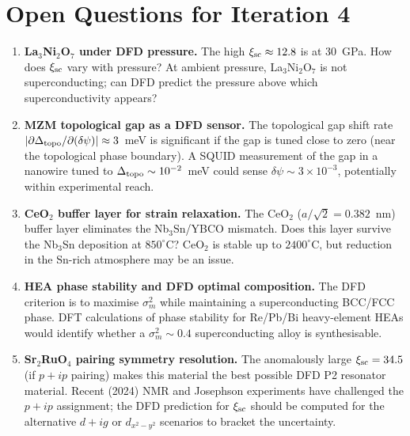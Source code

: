 \documentclass[11pt]{article}
\newcommand{\ee}[1]{\times 10^{#1}}
\begin{document}
\section*{Open Questions for Iteration 4}

\begin{enumerate}[leftmargin=*]

\item \textbf{La$_3$Ni$_2$O$_7$ under DFD pressure.} The high $\xi_{\rm sc} \approx 12.8$
  is at 30~GPa. How does $\xi_{\rm sc}$ vary with pressure? At ambient
  pressure, La$_3$Ni$_2$O$_7$ is not superconducting; can DFD predict
  the pressure above which superconductivity appears?

\item \textbf{MZM topological gap as a DFD sensor.} The topological gap shift
  rate $|\partial\Delta_{\rm topo}/\partial(\delta\psi)| \approx 3$~meV is
  significant if the gap is tuned close to zero (near the topological phase
  boundary). A SQUID measurement of the gap in a nanowire tuned to
  $\Delta_{\rm topo} \sim 10^{-2}$~meV could sense $\delta\psi \sim 3\ee{-3}$,
  potentially within experimental reach.

\item \textbf{CeO$_2$ buffer layer for strain relaxation.} The CeO$_2$
  ($a/\sqrt{2} = 0.382$~nm) buffer layer eliminates the Nb$_3$Sn/YBCO
  mismatch. Does this layer survive the Nb$_3$Sn deposition at $850^\circ$C?
  CeO$_2$ is stable up to $2400^\circ$C, but reduction in the Sn-rich atmosphere
  may be an issue.

\item \textbf{HEA phase stability and DFD optimal composition.}
  The DFD criterion is to maximise $\sigma_m^2$ while maintaining a
  superconducting BCC/FCC phase. DFT calculations of phase stability
  for Re/Pb/Bi heavy-element HEAs would identify whether a $\sigma_m^2 \sim 0.4$
  superconducting alloy is synthesisable.

\item \textbf{Sr$_2$RuO$_4$ pairing symmetry resolution.} The anomalously
  large $\xi_{\rm sc} = 34.5$ (if $p+ip$ pairing) makes this material the
  best possible DFD P2 resonator material. Recent (2024) NMR and Josephson
  experiments have challenged the $p+ip$ assignment; the DFD prediction for
  $\xi_{\rm sc}$ should be computed for the alternative $d+ig$ or $d_{x^2-y^2}$
  scenarios to bracket the uncertainty.

\end{enumerate}
\end{document}
